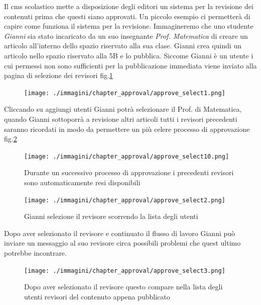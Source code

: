 Il cms scolastico  mette a disposizione degli editori un sistema per la revisione dei contenuti prima che questi siano approvati. Un piccolo esempio ci permetterà di capire come funziona il sistema per la revisione. Immagineremo che uno studente \textsl{Gianni} sia stato incaricato da un suo insegnante \textsl{Prof. Matematica} di creare un articolo all'interno dello spazio riservato alla sua clase.
Gianni crea quindi un articolo nello spazio riservato alla 5B e lo pubblica. Siccome Gianni è un utente  i cui permessi non sono sufficienti per la pubblicazione immediata viene inviato alla pagina di selezione dei revisori fig.\ref{fig:approve_select1}
\begin{figure}[H]
 \centering
 \texttt{[image: ./immagini/chapter\_approval/approve\_select1.png]}
 \label{fig:approve_select1}
\end{figure}
Cliccando su aggiungi utenti Gianni potrà selezionare il Prof. di Matematica, quando Gianni sottoporrà a revisione altri articoli tutti i revisori precedenti saranno ricordati in modo da permettere un più celere processo di approvazione fig.\ref{fig:approve_select10}
\begin{figure}[H]
 \centering
 \texttt{[image: ./immagini/chapter\_approval/approve\_select10.png]}
\caption{Durante un successivo processo di approvazione i precedenti revisori sono automaticamente resi disponibili} 
\label{fig:approve_select10}
\end{figure}

\begin{figure}[H]
 \centering
 \texttt{[image: ./immagini/chapter\_approval/approve\_select2.png]}
\caption{Gianni selezione il revisore scorrendo la lista degli utenti}  
\label{fig:approve_select2}
\end{figure}

Dopo aver selezionato il revisore e continuato il flusso di lavoro Gianni può inviare un messaggio al suo revisore circa possibili problemi che quest ultimo potrebbe incontrare.
\begin{figure}[H]
 \centering
 \texttt{[image: ./immagini/chapter\_approval/approve\_select3.png]}
\caption{Dopo aver selezionato il revisore questo compare nella lista degli utenti revisori del contenuto appena pubblicato}
\label{fig:approve_select3}
\end{figure}

